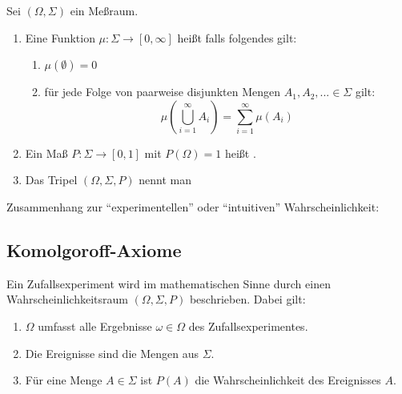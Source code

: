 \begin{definition} Sei $(\Omega,\Sigma)$ ein Meßraum.
\begin{enumerate}
 \item Eine Funktion $\mu: \Sigma \rightarrow [0,\infty]$ heißt  falls folgendes gilt:
  \begin{enumerate}
   \item $\mu(\emptyset) = 0$

   \item für jede Folge von paarweise disjunkten Mengen $A_1, A_2, ... \in \Sigma$ gilt:
$$ \mu \left ( \bigcup_{i=1}^\infty A_i \right ) = \sum_{i=1}^\infty \mu \left ( A_i \right ) $$
  \end{enumerate}
 \item Ein Maß $P: \Sigma \rightarrow [0,1]$ mit $P(\Omega) = 1$ heißt .
 \item Das Tripel $(\Omega,\Sigma,P)$ nennt man 
\end{enumerate}
\end{definition}

Zusammenhang zur ``experimentellen'' oder ``intuitiven'' Wahrscheinlichkeit:

\subsection{Komolgoroff-Axiome}
Ein Zufallsexperiment wird im mathematischen Sinne durch einen Wahrscheinlichkeitsraum $(\Omega,\Sigma,P)$ beschrieben. Dabei gilt:
\begin{enumerate}
 \item $\Omega$ umfasst alle Ergebnisse $\omega \in \Omega$ des Zufallsexperimentes.
 \item Die Ereignisse sind die Mengen aus $\Sigma$.
 \item Für eine Menge $A \in \Sigma$ ist $P(A)$ die Wahrscheinlichkeit des Ereignisses $A$.
\end{enumerate}

